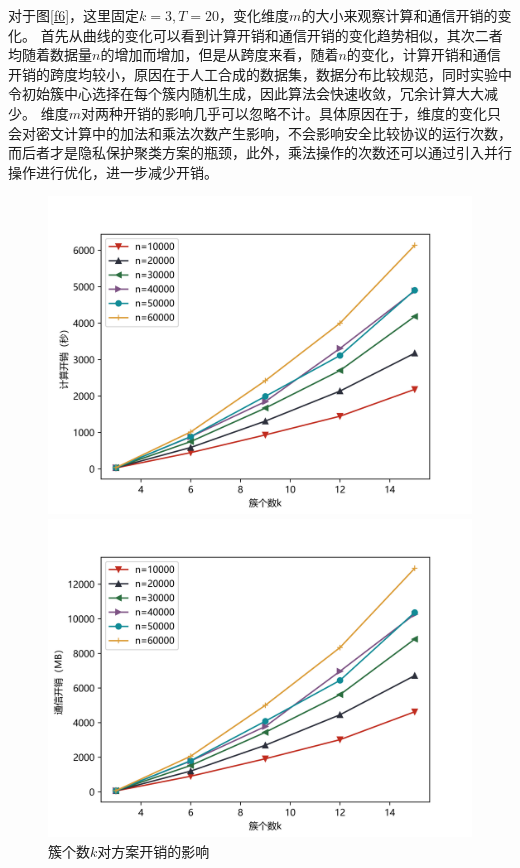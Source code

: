 对于图\ref{f6}，这里固定$k=3, T=20$，变化维度$ m $的大小来观察计算和通信开销的变化。
首先从曲线的变化可以看到计算开销和通信开销的变化趋势相似，其次二者均随着数据量$ n $的增加而增加，但是从跨度来看，随着$ n $的变化，计算开销和通信开销的跨度均较小，原因在于人工合成的数据集，数据分布比较规范，同时实验中令初始簇中心选择在每个簇内随机生成，因此算法会快速收敛，冗余计算大大减少。
维度$ m $对两种开销的影响几乎可以忽略不计。具体原因在于，维度的变化只会对密文计算中的加法和乘法次数产生影响，不会影响安全比较协议的运行次数，而后者才是隐私保护聚类方案的瓶颈，此外，乘法操作的次数还可以通过引入并行操作进行优化，进一步减少开销。

\begin{figure}[htbp]
	\begin{minipage}[t]{0.5\linewidth}
		\includegraphics[width=\linewidth]{img/newk_time.png}
		
	\end{minipage}%
	\hfill%
	\begin{minipage}[t]{0.5\linewidth}
		\includegraphics[width=\linewidth]{img/newk_comm.png}
		
	\end{minipage}
	\caption{簇个数$ k $对方案开销的影响}
	\label{f7}
\end{figure}

